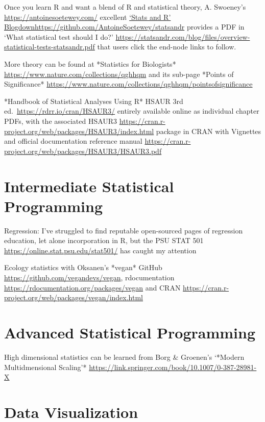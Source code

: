 \documentclass[
]{book}
\begin{document}
Once you learn R and want a blend of R and statistical theory, A. Swoeney's \url{https://antoinesoetewey.com/} excellent \href{\%5Bhttps://github.com/AntoineSoetewey/statsandr}{`Stats and R' Blogdown}\url{https://github.com/AntoineSoetewey/statsandr} provides a PDF in `What statistical test should I do?' \url{https://statsandr.com/blog/files/overview-statistical-tests-statsandr.pdf} that users click the end-node links to follow.

More theory can be found at *Statistics for Biologists* \url{https://www.nature.com/collections/qghhqm} and its sub-page *Points of Significance* \url{https://www.nature.com/collections/qghhqm/pointsofsignificance}

*Handbook of Statistical Analyses Using R* HSAUR 3rd ed.~\url{https://rdrr.io/cran/HSAUR3/} entirely available online as individual chapter PDFs, with the associated HSAUR3 \url{https://cran.r-project.org/web/packages/HSAUR3/index.html} package in CRAN with Vignettes and official documentation reference manual \url{https://cran.r-project.org/web/packages/HSAUR3/HSAUR3.pdf}

\section{Intermediate Statistical Programming}\label{intermediate-statistical-programming}

Regression: I've struggled to find reputable open-sourced pages of regression education, let alone incorporation in R, but the PSU STAT 501 \url{https://online.stat.psu.edu/stat501/} has caught my attention

Ecology statistics with Oksanen's *vegan* GitHub \url{https://github.com/vegandevs/vegan}, rdocumentation \url{https://rdocumentation.org/packages/vegan} and CRAN \url{https://cran.r-project.org/web/packages/vegan/index.html}

\section{Advanced Statistical Programming}\label{advanced-statistical-programming}

High dimensional statistics can be learned from Borg \& Groenen's `*Modern Multidmensional Scaling'* \url{https://link.springer.com/book/10.1007/0-387-28981-X}

\section{Data Visualization}\label{data-visualization}
\end{document}
